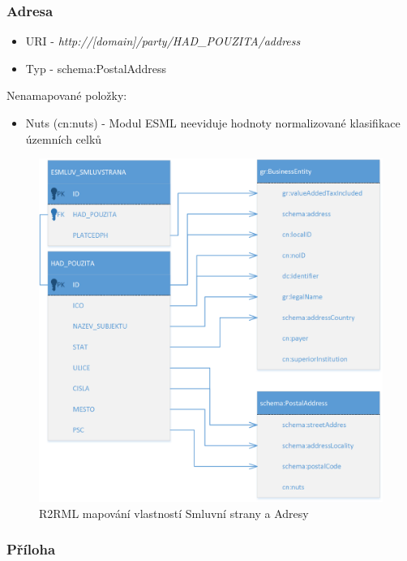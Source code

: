 \subsubsection*{Adresa}

\begin{itemize}
\item URI - \textit{http://[domain]/party/{HAD\_POUZITA}/address}
\item Typ - schema:PostalAddress

\end{itemize}

Nenamapované položky:
\begin{itemize}
\item Nuts (cn:nuts) - Modul ESML neeviduje hodnoty normalizované klasifikace územních celků
\end{itemize}

\begin{figure}[H]
\centerline{\includegraphics[width=\textwidth]{img/mapParty.eps}}
\caption{R2RML mapování vlastností Smluvní strany a Adresy}
\label{obr:mapParty}
\end{figure}

\subsubsection*{Příloha}

